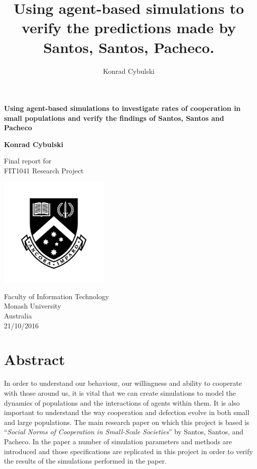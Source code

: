 \documentclass[10pt,a4paper]{article}
\author{Konrad Cybulski}
\title{Using agent-based simulations to verify the predictions made by Santos, Santos, Pacheco.}
\begin{document}
\begin{titlepage}
    \begin{center}
        \vspace*{1cm}
        
        \LARGE
        \textbf{Using agent-based simulations to investigate rates of cooperation in small populations and verify the findings of Santos, Santos and Pacheco}
        
        \vspace{2cm}
        \Large
        
        \textbf{Konrad Cybulski}
        
        \vfill
        
        Final report for\\
        FIT1041 Research Project
        
        \vspace{0.8cm}
        
        \includegraphics[width=0.4\textwidth]{monash_emblem.jpg}
        
        \large
        Faculty of Information Technology\\
        Monash University\\
        Australia\\
        21/10/2016
        
    \end{center}
\end{titlepage}

\begin{Large}

\end{Large}

\pagebreak
\tableofcontents
\pagebreak

\section{Abstract}
In order to understand our behaviour, our willingness and ability to cooperate with those around us, it is vital that we can create simulations to model the dynamics of populations and the interactions of agents within them.
It is also important to understand the way cooperation and defection evolve in both small and large populations.
The main research paper on which this project is based is “\textit{Social Norms of Cooperation in Small-Scale Societies}” by Santos, Santos, and Pacheco. 
In the paper a number of simulation parameters and methods are introduced and those specifications are replicated in this project in order to verify the results of the simulations performed in the paper.
\end{document}
